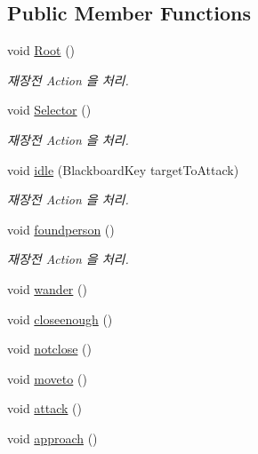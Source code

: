 \subsection*{Public Member Functions}
\begin{DoxyCompactItemize}
\item 
void \hyperlink{class_bear_behavior_tree___behavior_tree_ad4f48189adfab95137579f57db934c32}{Root} ()
\begin{DoxyCompactList}\small\item\em 재장전 Action 을 처리. \end{DoxyCompactList}\item 
void \hyperlink{class_bear_behavior_tree___behavior_tree_aa4c0e29b418915e15eaffc507b57ecc6}{Selector} ()
\begin{DoxyCompactList}\small\item\em 재장전 Action 을 처리. \end{DoxyCompactList}\item 
void \hyperlink{class_bear_behavior_tree___behavior_tree_a350ba1088d2150f634458893b4e283a3}{idle} (Blackboard\+Key target\+To\+Attack)
\begin{DoxyCompactList}\small\item\em 재장전 Action 을 처리. \end{DoxyCompactList}\item 
void \hyperlink{class_bear_behavior_tree___behavior_tree_ad69b27f8f47187e6cd2c388bbbae21df}{foundperson} ()
\begin{DoxyCompactList}\small\item\em 재장전 Action 을 처리. \end{DoxyCompactList}\item 
void \hyperlink{class_bear_behavior_tree___behavior_tree_ac9bc4af1b6c0cd29a866334af35a0792}{wander} ()
\item 
void \hyperlink{class_bear_behavior_tree___behavior_tree_a8fac43750797adcaf988b98ea9e584b3}{closeenough} ()
\item 
void \hyperlink{class_bear_behavior_tree___behavior_tree_a30eb18a71578c736ec8a1f0434488ace}{notclose} ()
\item 
void \hyperlink{class_bear_behavior_tree___behavior_tree_a5d2bb95c7d460abdc1e47a812ea4a7af}{moveto} ()
\item 
void \hyperlink{class_bear_behavior_tree___behavior_tree_a7d65c118fb3a712320e68767efca7156}{attack} ()
\item 
void \hyperlink{class_bear_behavior_tree___behavior_tree_a9024fccd3bdb22ed54a2d956653f3c77}{approach} ()
\end{DoxyCompactItemize}
